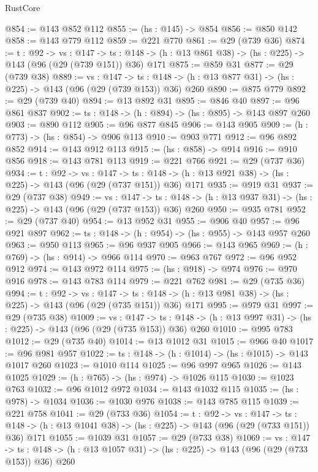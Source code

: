 \begin{lexlean}{RustCore}
\begin{coremodule}
{\begin{coremodule}
{{{@854 := @143 @852 @112
@855 := (hs : @145) -> @854
@856 := @850 @142
@858 := @143 @779 @112
@859 := @221 @770
@861 := @29 (@739 @36)
@874 := {t : @92} ->
  {vs : @147} ->
  {ts : @148} -> (h : @13 @861 @38) -> (hs : @225) -> @143 (@96 (@29 (@739 @151)) @36) @171
@875 := @859 @31
@877 := @29 (@739 @38)
@889 := {vs : @147} ->
  {ts : @148} -> (h : @13 @877 @31) -> (hs : @225) -> @143 (@96 (@29 (@739 @153)) @36) @260
@890 := @875 @779
@892 := @29 (@739 @40)
@894 := @13 @892 @31
@895 := @846 @40
@897 := @96 @861 @837
@902 := {ts : @148} -> (h : @894) -> (hs : @895) -> @143 @897 @260
@903 := @890 @112
@905 := @96 @877 @845
@906 := @143 @905
@909 := (h : @773) -> (hs : @854) -> @906 @113
@910 := @903 @771
@912 := @96 @892 @852
@914 := @143 @912 @113
@915 := (hs : @858) -> @914
@916 := @910 @856
@918 := @143 @781 @113
@919 := @221 @766
@921 := @29 (@737 @36)
@934 := {t : @92} ->
  {vs : @147} ->
  {ts : @148} -> (h : @13 @921 @38) -> (hs : @225) -> @143 (@96 (@29 (@737 @151)) @36) @171
@935 := @919 @31
@937 := @29 (@737 @38)
@949 := {vs : @147} ->
  {ts : @148} -> (h : @13 @937 @31) -> (hs : @225) -> @143 (@96 (@29 (@737 @153)) @36) @260
@950 := @935 @781
@952 := @29 (@737 @40)
@954 := @13 @952 @31
@955 := @906 @40
@957 := @96 @921 @897
@962 := {ts : @148} -> (h : @954) -> (hs : @955) -> @143 @957 @260
@963 := @950 @113
@965 := @96 @937 @905
@966 := @143 @965
@969 := (h : @769) -> (hs : @914) -> @966 @114
@970 := @963 @767
@972 := @96 @952 @912
@974 := @143 @972 @114
@975 := (hs : @918) -> @974
@976 := @970 @916
@978 := @143 @783 @114
@979 := @221 @762
@981 := @29 (@735 @36)
@994 := {t : @92} ->
  {vs : @147} ->
  {ts : @148} -> (h : @13 @981 @38) -> (hs : @225) -> @143 (@96 (@29 (@735 @151)) @36) @171
@995 := @979 @31
@997 := @29 (@735 @38)
@1009 := {vs : @147} ->
  {ts : @148} -> (h : @13 @997 @31) -> (hs : @225) -> @143 (@96 (@29 (@735 @153)) @36) @260
@1010 := @995 @783
@1012 := @29 (@735 @40)
@1014 := @13 @1012 @31
@1015 := @966 @40
@1017 := @96 @981 @957
@1022 := {ts : @148} -> (h : @1014) -> (hs : @1015) -> @143 @1017 @260
@1023 := @1010 @114
@1025 := @96 @997 @965
@1026 := @143 @1025
@1029 := (h : @765) -> (hs : @974) -> @1026 @115
@1030 := @1023 @763
@1032 := @96 @1012 @972
@1034 := @143 @1032 @115
@1035 := (hs : @978) -> @1034
@1036 := @1030 @976
@1038 := @143 @785 @115
@1039 := @221 @758
@1041 := @29 (@733 @36)
@1054 := {t : @92} ->
  {vs : @147} ->
  {ts : @148} -> (h : @13 @1041 @38) -> (hs : @225) -> @143 (@96 (@29 (@733 @151)) @36) @171
@1055 := @1039 @31
@1057 := @29 (@733 @38)
@1069 := {vs : @147} ->
  {ts : @148} -> (h : @13 @1057 @31) -> (hs : @225) -> @143 (@96 (@29 (@733 @153)) @36) @260
}}}
\end{coremodule}}
\end{coremodule}
\end{lexlean}
